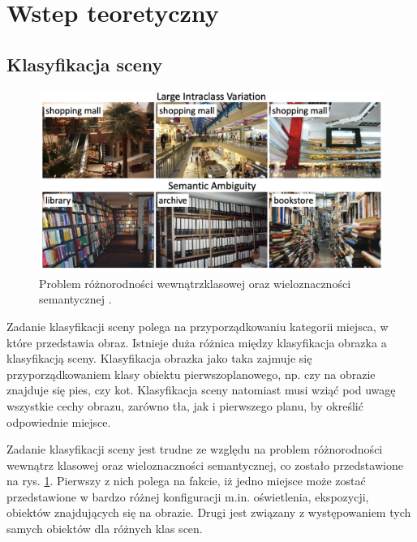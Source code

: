 \newpage %
\section{Wstep teoretyczny}


\subsection{Klasyfikacja sceny}
\begin{figure}
    \includegraphics[width=\textwidth]{img/scene_class.png}
    \caption{Problem różnorodności wewnątrzklasowej oraz wieloznaczności semantycznej \cite{zeng2021deep}.}
    \label{fig:scene-class}
\end{figure}

Zadanie klasyfikacji sceny polega na przyporządkowaniu kategorii miejsca, w które przedstawia obraz. Istnieje duża różnica między klasyfikacja obrazka a klasyfikacją sceny. Klasyfikacja obrazka jako taka zajmuje się przyporządkowaniem klasy obiektu pierwszoplanowego, np. czy na obrazie znajduje się pies, czy kot. Klasyfikacja sceny natomiast musi wziąć pod uwagę wszystkie cechy obrazu, zarówno tła, jak i pierwszego planu, by określić odpowiednie miejsce.

Zadanie klasyfikacji sceny jest trudne ze względu na problem różnorodności wewnątrz klasowej oraz wieloznaczności semantycznej, co zostało przedstawione na rys. \ref{fig:scene-class}. Pierwszy z nich polega na fakcie, iż jedno miejsce może zostać przedstawione w bardzo różnej konfiguracji m.in. oświetlenia, ekspozycji, obiektów znajdujących się na obrazie. Drugi jest związany z występowaniem tych samych obiektów dla różnych klas scen.

